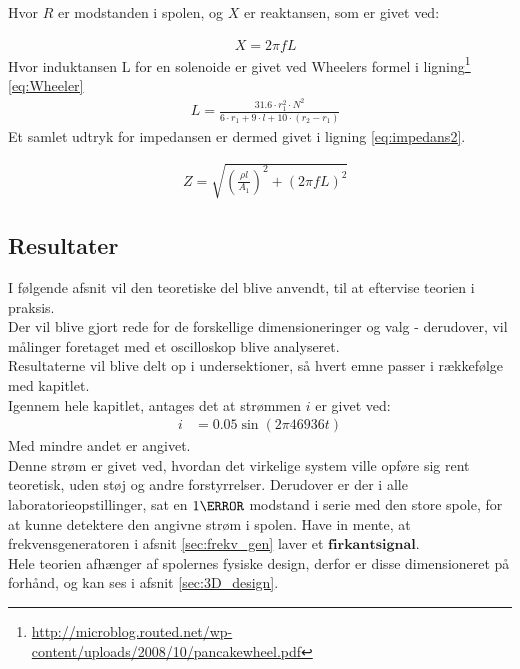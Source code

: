 Hvor $R$ er modstanden i spolen, og $X$ er reaktansen, som er givet ved:

\begin{align}
	& X=2\pi f L \nonumber
\end{align}
Hvor induktansen L for en solenoide er givet ved Wheelers formel i ligning\footnote{\url{http://microblog.routed.net/wp-content/uploads/2008/10/pancakewheel.pdf}} \ref{eq:Wheeler}
\begin{align}
	& L =\frac{31.6\cdot r_1^2\cdot N^2}{6\cdot r_1+9\cdot l + 10\cdot (r_2-r_1)}  \label{eq:Wheeler}
\end{align}
Et samlet udtryk for impedansen er dermed givet i ligning \ref{eq:impedans2}.

\begin{align}
	& Z=\sqrt{\left(\frac{\rho l}{A_1}\right)^2+\left(2\pi f L\right)^2} \label{eq:impedans2}
\end{align}


\subsection{Resultater}
I følgende afsnit vil den teoretiske del blive anvendt, til at eftervise teorien i praksis.\\
Der vil blive gjort rede for de forskellige dimensioneringer og valg - derudover, vil målinger foretaget med et oscilloskop blive analyseret.\\ 
Resultaterne vil blive delt op i undersektioner, så hvert emne passer i rækkefølge med kapitlet.\\
Igennem hele kapitlet, antages det at strømmen $i$ er givet ved:
\begin{align}
	 i&=0.05\sin{(2\pi46936 t)} \nonumber
\end{align}
Med mindre andet er angivet.\\
Denne strøm er givet ved, hvordan det virkelige system ville opføre sig rent teoretisk, uden støj og andre forstyrrelser.
Derudover er der i alle laboratorieopstillinger, sat en $1\ohm$ modstand i serie med den store spole, for at kunne detektere den angivne strøm i spolen.
Have in mente, at frekvensgeneratoren i afsnit \ref{sec:frekv_gen} laver et $\textbf{firkantsignal}$.\\ 
Hele teorien afhænger af spolernes fysiske design, derfor er disse dimensioneret på forhånd, og kan ses i afsnit \ref{sec:3D_design}.

